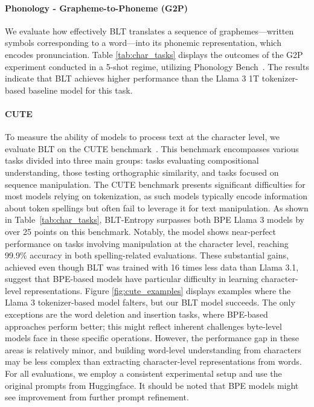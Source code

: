\paragraph{Phonology - Grapheme-to-Phoneme (G2P)} We evaluate how effectively {\textsc BLT} translates a sequence of graphemes—written symbols corresponding to a word—into its phonemic representation, which encodes pronunciation. Table \ref{tab:char_tasks} displays the outcomes of the G2P experiment conducted in a 5-shot regime, utilizing Phonology Bench~\citep{suvarna2024phonologybench}. The results indicate that {\textsc BLT} achieves higher performance than the Llama 3 1T tokenizer-based baseline model for this task.

\paragraph{CUTE}
To measure the ability of models to process text at the character level, we evaluate {\textsc BLT} on the CUTE benchmark~\citep{edman2024cute}. This benchmark encompasses various tasks divided into three main groups: tasks evaluating compositional understanding, those testing orthographic similarity, and tasks focused on sequence manipulation. The CUTE benchmark presents significant difficulties for most models relying on tokenization, as such models typically encode information about token spellings but often fail to leverage it for text manipulation. As shown in Table~\ref{tab:char_tasks}, {\textsc BLT}-Entropy surpasses both BPE Llama 3 models by over 25 points on this benchmark. Notably, the model shows near-perfect performance on tasks involving manipulation at the character level, reaching 99.9\% accuracy in both spelling-related evaluations. These substantial gains, achieved even though {\textsc BLT} was trained with 16 times less data than Llama 3.1, suggest that BPE-based models have particular difficulty in learning character-level representations. Figure \ref{fig:cute_examples} displays examples where the Llama 3 tokenizer-based model falters, but our {\textsc BLT} model succeeds. The only exceptions are the word deletion and insertion tasks, where BPE-based approaches perform better; this might reflect inherent challenges byte-level models face in these specific operations. However, the performance gap in these areas is relatively minor, and building word-level understanding from characters may be less complex than extracting character-level representations from words. For all evaluations, we employ a consistent experimental setup and use the original prompts from Huggingface. It should be noted that BPE models might see improvement from further prompt refinement.


